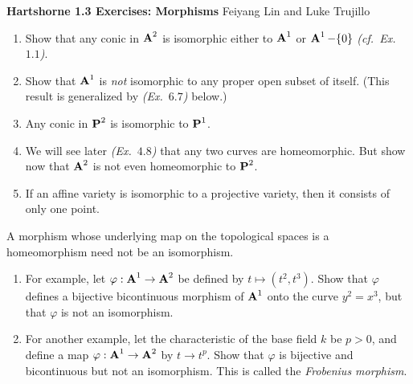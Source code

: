 \documentclass[10pt]{amsart}
\newcommand{\header}[2]{
    {\noindent
    {\Large \bf Hartshorne #1 Exercises: #2}
    \hfill 
    {\large Feiyang Lin and Luke Trujillo}
    \vspace{0.5cm}}
}
\begin{document}
\header{1.3}{Morphisms}

\begin{exercise}[3.1]
    \begin{enumerate}[itemsep=1pt]
    \item Show that any conic in $\aa^2$ is isomorphic either to $\aa^1$ or
        $\aa^1 - \{0\}$ \emph{(cf.\ Ex.~$1.1$)}.
    \item Show that $\aa^1$ is \emph{not} isomorphic to any proper open subset
        of itself. (This result is generalized by \emph{(Ex.~$6.7$)} below.)
    \item Any conic in $\pp^2$ is isomorphic to $\pp^1$.
    \item We will see later \emph{(Ex.\ $4.8$)} that any two curves are
        homeomorphic. But show now that $\aa^2$ is not even homeomorphic to
        $\pp^2$.
    \item If an affine variety is isomorphic to a projective variety, then it
        consists of only one point.
    \end{enumerate}
\end{exercise}


\begin{exercise}[3.2]
    A morphism whose underlying map on the topological spaces 
    is a homeomorphism need not be an isomorphism.
    \begin{enumerate}[itemsep=1pt]
        \item For example, let $\varphi : \aa^1  \to \aa^2$ be defined by 
        $t \mapsto (t^2,t^3)$. Show that $\varphi$ defines a
        bijective bicontinuous morphism of $\aa^1$ onto the curve $y^2 = x^3$, 
        but that $\varphi$ is not an isomorphism.

        \item For another example, let the characteristic of the base field $k$ be $p > 0$, and
        define a map $\varphi : \aa^1 \to \aa^2$ by $t \to t^p$. Show that $\varphi$ 
        is bijective and bicontinuous but not an isomorphism. 
        This is called the \emph{Frobenius morphism}.
    \end{enumerate}
\end{exercise}
\end{document}
